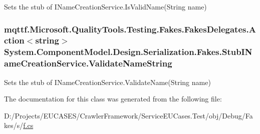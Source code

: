 Sets the stub of I\-Name\-Creation\-Service.\-Is\-Valid\-Name(\-String name)

\hypertarget{class_system_1_1_component_model_1_1_design_1_1_serialization_1_1_fakes_1_1_stub_i_name_creation_service_a3dcee52c32a1d2af621fcb9e412ca494}{
\subsubsection[{Validate\-Name\-String}]{\setlength{\rightskip}{0pt plus 5cm}mqttf.\-Microsoft.\-Quality\-Tools.\-Testing.\-Fakes.\-Fakes\-Delegates.\-Action$<$string$>$ System.\-Component\-Model.\-Design.\-Serialization.\-Fakes.\-Stub\-I\-Name\-Creation\-Service.\-Validate\-Name\-String}}\label{class_system_1_1_component_model_1_1_design_1_1_serialization_1_1_fakes_1_1_stub_i_name_creation_service_a3dcee52c32a1d2af621fcb9e412ca494}


Sets the stub of I\-Name\-Creation\-Service.\-Validate\-Name(\-String name)



The documentation for this class was generated from the following file\-:\begin{DoxyCompactItemize}
\item 
D\-:/\-Projects/\-E\-U\-C\-A\-S\-E\-S/\-Crawler\-Framework/\-Service\-E\-U\-Cases.\-Test/obj/\-Debug/\-Fakes/s/\hyperlink{s_2f_8cs}{f.\-cs}\end{DoxyCompactItemize}
